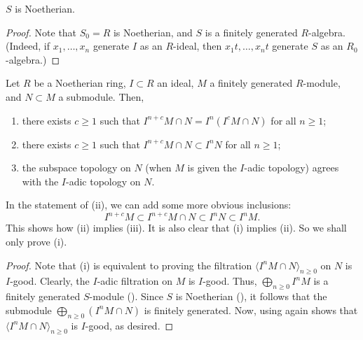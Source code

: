 \documentclass[12pt]{article}
\begin{document}
\begin{lem} \label{lem:rees-algebra-noetherian}
	$S$ is Noetherian.
\end{lem}
\begin{proof} 
	Note that $S_{0} = R$ is Noetherian, and $S$ is a finitely generated $R$-algebra. (Indeed, if $x_{1}, \ldots, x_{n}$ generate $I$ as an $R$-ideal, then $x_{1} t, \ldots, x_{n} t$ generate $S$ as an $R_{0}$-algebra.)
\end{proof}

\begin{thm} \label{thm:artin-rees}
	Let $R$ be a Noetherian ring, $I \subset R$ an ideal, $M$ a finitely generated $R$-module, and $N \subset M$ a submodule. \newline
	Then,
	\begin{enumerate}[label=(\roman*)]
		\item there exists $c \ge 1$ such that $I^{n + c} M \cap N = I^{n}(I^{c} M \cap N)$ for all $n \ge 1$;
		\item there exists $c \ge 1$ such that $I^{n + c} M \cap N \subset I^{n} N$ for all $n \ge 1$;
		\item the subspace topology on $N$ (when $M$ is given the $I$-adic topology) agrees with the $I$-adic topology on $N$.
	\end{enumerate}
\end{thm}
In the statement of (ii), we can add some more obvious inclusions:
\begin{equation*} 
	I^{n + c} M \subset I^{n + c} M \cap N \subset I^{n} N \subset I^{n} M.
\end{equation*}
This shows how (ii) implies (iii). It is also clear that (i) implies (ii). So we shall only prove (i).

\begin{proof} 
	Note that (i) is equivalent to proving the filtration $\langle I^{n} M \cap N \rangle_{n \ge 0}$ on $N$ is $I$-good. \newline
	Clearly, the $I$-adic filtration on $M$ is $I$-good. Thus, $\bigoplus_{n \ge 0} I^{n} M$ is a finitely generated $S$-module (). \newline
	Since $S$ is Noetherian (), it follows that the submodule $\bigoplus_{n \ge 0} (I^{n} M \cap N)$ is finitely generated. \newline
	Now, using  again shows that $\langle I^{n} M \cap N \rangle_{n \ge 0}$ is $I$-good, as desired.
\end{proof}
\end{document}
